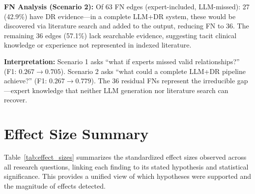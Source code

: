 \documentclass{article}
\begin{document}
\textbf{FN Analysis (Scenario 2):} Of 63 FN edges (expert-included, LLM-missed): 27 (42.9\%) have DR evidence---in a complete LLM+DR system, these would be discovered via literature search and added to the output, reducing FN to 36. The remaining 36 edges (57.1\%) lack searchable evidence, suggesting tacit clinical knowledge or experience not represented in indexed literature.

\textbf{Interpretation:} Scenario 1 asks ``what if experts missed valid relationships?'' (F1: $0.267 \to 0.705$). Scenario 2 asks ``what could a complete LLM+DR pipeline achieve?'' (F1: $0.267 \to 0.779$). The 36 residual FNs represent the irreducible gap---expert knowledge that neither LLM generation nor literature search can recover.

\begin{center}
\end{center}

\section{Effect Size Summary}

Table~\ref{tab:effect_sizes} summarizes the standardized effect sizes observed across all research questions, linking each finding to its stated hypothesis and statistical significance. This provides a unified view of which hypotheses were supported and the magnitude of effects detected.
\end{document}
